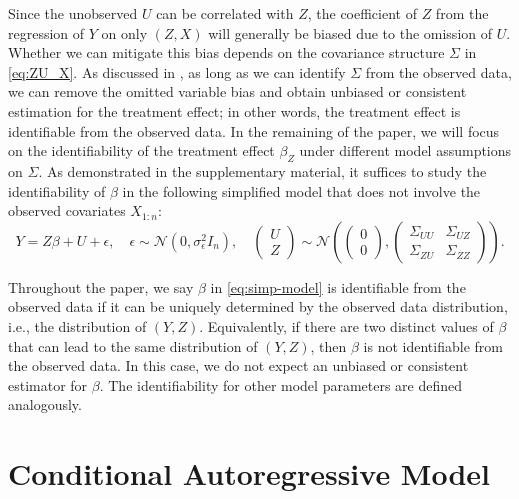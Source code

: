 \documentclass[11pt]{article}
\theoremstyle{definition}
\theoremstyle{remark}
\begin{document}
Since the unobserved $U$ can be correlated with $Z$, the coefficient of $Z$ from the regression of $Y$ on only $(Z,X)$ will generally be biased due to the omission of $U$.
Whether we can mitigate this bias depends on the covariance structure $\Sigma$ in \eqref{eq:ZU_X}.
As discussed in \citet{schnell2020mitigating}, as long as we can identify $\Sigma$ from the observed data, we can remove the omitted variable bias and obtain unbiased or consistent estimation for the treatment effect; in other words, the treatment effect is identifiable from the observed data. 
In the remaining of the paper, we will focus on the identifiability of the treatment effect $\beta_Z$ under different model assumptions on $\Sigma$. 
As demonstrated in the supplementary material, it suffices to study the identifiability of $\beta$ in the following simplified model that does not involve the observed covariates $X_{1:n}$:
\begin{equation}\label{eq:simp-model}
    Y = Z \beta + U + \epsilon, 
    \quad \epsilon \sim \mathcal{N}(0, \sigma_{\epsilon}^2 I_n), 
    \quad 
    \begin{pmatrix}
        U\\
        Z
    \end{pmatrix} 
    \sim \mathcal{N}
    \left(  
    \begin{pmatrix}
        0\\
        0
    \end{pmatrix}, 
    \begin{pmatrix}
        \Sigma_{UU} & \Sigma_{UZ}\\
        \Sigma_{ZU} & \Sigma_{ZZ}
    \end{pmatrix}
    \right). 
\end{equation}


Throughout the paper, we say $\beta$ in \eqref{eq:simp-model}
is identifiable from the observed data if it can be uniquely determined by the observed data distribution, i.e., the distribution of $(Y,Z)$. 
Equivalently, if there are two distinct values of $\beta$ that can lead to the same distribution of $(Y,Z)$, then $\beta$ is not identifiable from the observed data. 
In this case, we do not expect an unbiased or consistent estimator for $\beta$. The identifiability for other model parameters are defined analogously. 





\section{Conditional Autoregressive Model}
\end{document}
